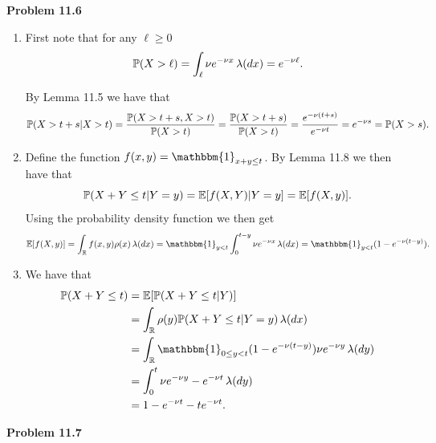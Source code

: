 \textbf{Problem 11.6}
\begin{enumerate}[label={(\alph*)}]
\item First note that for any $\ell \ge 0$ 
\[
	\mathbb P(X > \ell) = \int_{\ell} \nu e^{-\nu x} \, \lambda(dx) 
	= e^{-\nu \ell}.
\]

By Lemma 11.5 we have that
\[
	\mathbb P(X > t +s | X > t) = \frac{\mathbb P(X > t + s, X > t)}{\mathbb P(X > t)}
	= \frac{\mathbb P(X > t + s)}{\mathbb P(X > t)}
	= \frac{e^{-\nu(t + s)}}{e^{-\nu t}} = e^{-\nu s} = \mathbb P(X > s).
\]
\item Define the function $f(x,y) = \mathbbm{1}_{x + y \le t}$. By Lemma 11.8 we then have that
\[
	\mathbb P(X + Y \le t | Y = y) = \mathbb E[f(X,Y) | Y = y]
	= \mathbb E[f(X,y)].
\]
Using the probability density function we then get
\[
	\bbE[f(X,y)] = \int_{\bbR} f(x,y) \rho(x) \, \lambda(dx)
	= \mathbbm{1}_{y < t} \int_0^{t-y} \nu e^{-\nu x} \, \lambda(dx)
	= \mathbbm{1}_{y < t} (1 - e^{-\nu(t-y)}).
\]
\item We have that
\begin{align*}
	\bbP(X + Y \le t) &= \bbE[\bbP(X+Y \le t | Y)]\\
	&= \int_\bbR \rho(y) \bbP(X + Y \le t | Y = y) \, \lambda(dx)\\
	&= \int_\bbR \mathbbm{1}_{0 \le y < t} (1 - e^{-\nu(t-y)}) \nu e^{-\nu y} \, \lambda(dy) \\
	&= \int_0^t \nu e^{-\nu y} - e^{-\nu t} \, \lambda(dy) \\
	&= 1 - e^{-\nu t} - t e^{-\nu t}.
\end{align*}
\end{enumerate}


\bigskip

\textbf{Problem 11.7}

